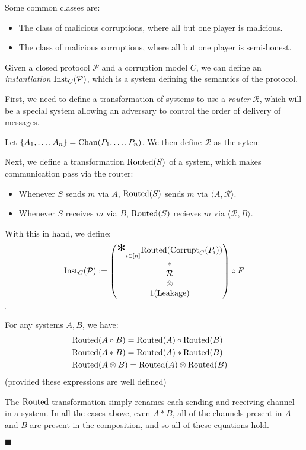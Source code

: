 Some common classes are:
\begin{itemize}
  \item The class of malicious corruptions, where all but one player is malicious.
  \item The class of malicious corruptions, where all but one player is semi-honest.
\end{itemize}

\begin{definition}[Instantiation]
  Given a closed protocol $\mathcal{P}$ and a corruption model $C$, we can
  define an \emph{instantiation} $\text{Inst}_C(\mathcal{P})$, which
  is a system defining the semantics of the protocol.

  First, we need to define a transformation of systems to use
  a \emph{router} $\mathcal{R}$, which will be a special system
  allowing an adversary to control the order of delivery of messages.

  Let $\{A_1, \ldots, A_n\} = \text{Chan}(P_1, \ldots, P_n)$.
  We then define $\mathcal{R}$ as the syten:

  Next, we define a transformation $\text{Routed}(S)$ of a system,
  which makes communication pass via the router:
  \begin{itemize}
    \item Whenever $S$ sends $m$ via $A$, $\text{Routed}(S)$ sends $m$ via $\langle A , \mathcal{R} \rangle$.
    \item Whenever $S$ receives $m$ via $B$, $\text{Routed}(S)$ recieves $m$ via $\langle \mathcal{R}, B \rangle$.
  \end{itemize}

With this in hand, we define:
$$
\tx{Inst}_C(\mathcal{P}) :=
  \begin{pmatrix}
    {\displaystyle \bigast}_{i \in [n]} \tx{Routed}(\tx{Corrupt}_C(P_i))\cr
    *\cr
    \mathcal{R}\cr
    \otimes\cr
    1(\tx{Leakage})
  \end{pmatrix}
  \circ F
$$


$\square$
\end{definition}

\begin{lemma}
  \label{thm:routed}
  For any systems $A, B$, we have:
$$
\begin{aligned}
  &\text{Routed}(A \circ B) = \text{Routed}(A) \circ \text{Routed}(B)\cr
  &\text{Routed}(A * B) = \text{Routed}(A) * \text{Routed}(B)\cr
  &\text{Routed}(A \otimes B) = \text{Routed}(A) \otimes \text{Routed}(B)\cr
\end{aligned}
$$
(provided these expressions are well defined)

 The $\text{Routed}$ transformation simply
renames each sending and receiving channel in a system.
In all the cases above, even $A * B$, all of the channels present
in $A$ and $B$ are present in the composition, and so all
of these equations hold.

$\blacksquare$
\end{lemma}


